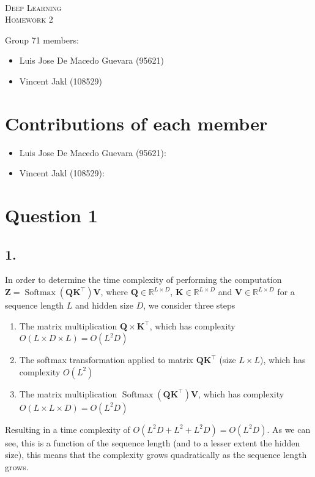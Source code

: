 \documentclass[11pt]{article}
\DeclareMathOperator{\softmax}{Softmax}
\begin{document}
\begin{center}
  \mbox{}\\[2.0cm]
  \textsc{\Huge Deep Learning}\\[1.0cm]
  \textsc{\Large Homework 2}\\[0.5cm]
\end{center}
\begin{flushleft}
  Group 71 members: \\[0.5cm]
  \begin{itemize}
  \item Luis Jose De Macedo Guevara (95621)
  \item Vincent Jakl (108529)
  \end{itemize}
\end{flushleft}

\section{Contributions of each member}
\begin{itemize}
    \item Luis Jose De Macedo Guevara (95621):
    \item Vincent Jakl (108529):
\end{itemize}
\pagebreak
\section{Question 1}
\subsection{1.}
In order to determine the time complexity of performing the computation $\bm{Z} = \softmax \left( \bm{Q} \bm{K}^{\top} \right) \bm{V}$, where $\bm{Q} \in \mathbb{R}^{L \times D}$, $\bm{K} \in \mathbb{R}^{L \times D}$ and $\bm{V} \in \mathbb{R}^{L \times D}$ for a sequence length $L$ and hidden size $D$, we consider three steps
\begin{enumerate}
\item The matrix multiplication $\bm{Q} \times \bm{K}^{\top}$, which has complexity $O \left( L \times D \times L \right) = O \left( L^{2} D \right)$
\item The softmax transformation applied to matrix $\bm{Q} \bm{K}^{\top}$ (size $L \times L$), which has complexity $O \left( L^{2} \right)$
\item The matrix multiplication $\softmax \left( \bm{Q} \bm{K}^{\top} \right) \bm{V}$, which has complexity $O \left( L \times L \times D \right) = O \left( L^{2} D \right)$
\end{enumerate}
Resulting in a time complexity of $O \left( L^{2}D + L^{2} + L^{2}D \right) = O \left( L^{2} D \right)$. As we can see, this is a function of the sequence length (and to a lesser extent the hidden size), this means that the complexity grows quadratically as the sequence length grows.
\end{document}
